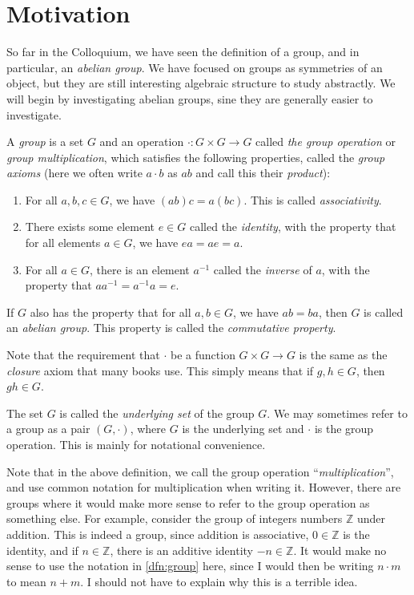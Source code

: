 \section{Motivation}

So far in the Colloquium, we have seen the definition of a group, and in particular, an \emph{abelian group}. We have focused on groups as symmetries of an object, but they are still interesting algebraic structure to study abstractly. We will begin by investigating abelian groups, sine they are generally easier to investigate.

\begin{definition}\label{dfn:group}
	A \emph{group} is a set $G$ and an operation $\cdot : G\times G \to G$ called \emph{the group operation} or \emph{group multiplication}, which satisfies the following properties, called the \emph{group axioms} (here we often write $a\cdot b$ as $ab$ and call this their \emph{product}):
	\begin{enumerate}
		\item For all $a,b,c\in G$, we have $(ab)c=a(bc)$. This is called \emph{associativity}.
		\item There exists some element $e\in G$ called the \emph{identity}, with the property that for all elements $a\in G$, we have $ea=ae=a$.
		\item For all $a\in G$, there is an element $a^{-1} $ called the \emph{inverse} of $a$, with the property that $a a^{-1} =a^{-1} a=e$.
	\end{enumerate}
	If $G$ also has the property that for all $a,b\in G$, we have $ab=ba$, then $G$ is called an \emph{abelian group}. This property is called the \emph{commutative property}.
\end{definition}

Note that the requirement that $\cdot $ be a function $G\times G\to G$ is the same as the \emph{closure} axiom that many books use. This simply means that if $g,h\in G$, then $gh\in G$.

The set $G$ is called the \emph{underlying set} of the group $G$.  We may sometimes refer to a group as a pair $(G,\cdot )$, where $G$ is the underlying set and $\cdot $ is the group operation. This is mainly for notational convenience.

Note that in the above definition, we call the group operation ``\emph{multiplication}'', and use common notation for multiplication when writing it. However, there are groups where it would make more sense to refer to the group operation as something else. For example, consider the group of integers numbers $\mathbb{Z} $ under addition. This is indeed a group, since addition is associative, $0\in\mathbb{Z} $ is the identity, and if $n\in\mathbb{Z} $, there is an additive identity $-n\in\mathbb{Z} $. It would make no sense to use the notation in \cref{dfn:group} here, since I would then be writing $n\cdot m$ to mean $n+m$. I should not have to explain why this is a terrible idea.

